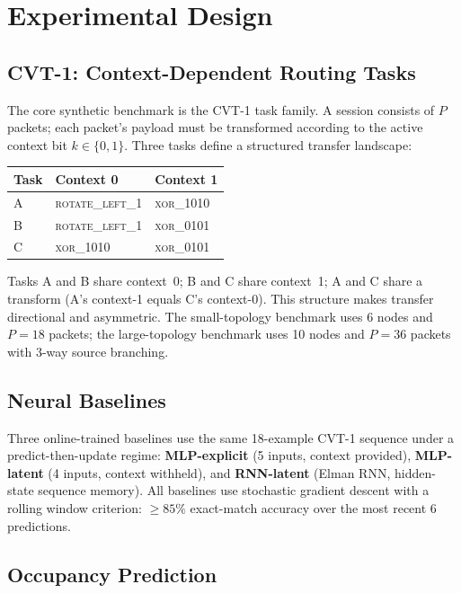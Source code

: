 \documentclass[10pt,twocolumn]{article}
\begin{document}
\section{Experimental Design}
\label{sec:experiments}

\subsection{CVT-1: Context-Dependent Routing Tasks}

The core synthetic benchmark is the CVT-1 task family.
A session consists of $P$ packets; each packet's payload must be transformed
according to the active context bit $k \in \{0, 1\}$.
Three tasks define a structured transfer landscape:

\begin{center}
\small
\begin{tabular}{lll}
\toprule
Task & Context 0 & Context 1 \\
\midrule
A & \textsc{rotate\_left\_1} & \textsc{xor\_1010} \\
B & \textsc{rotate\_left\_1} & \textsc{xor\_0101} \\
C & \textsc{xor\_1010}       & \textsc{xor\_0101} \\
\bottomrule
\end{tabular}
\end{center}

Tasks A and B share context~0; B and C share context~1; A and C share a
transform (A's context-1 equals C's context-0).
This structure makes transfer directional and asymmetric.
The small-topology benchmark uses 6 nodes and $P=18$ packets;
the large-topology benchmark uses 10 nodes and $P=36$ packets
with 3-way source branching.

\subsection{Neural Baselines}

Three online-trained baselines use the same 18-example CVT-1 sequence
under a predict-then-update regime:
\textbf{MLP-explicit} (5 inputs, context provided),
\textbf{MLP-latent} (4 inputs, context withheld), and
\textbf{RNN-latent} (Elman RNN, hidden-state sequence memory).
All baselines use stochastic gradient descent with a rolling window
criterion: $\geq\!85\%$ exact-match accuracy over the most recent 6 predictions.

\subsection{Occupancy Prediction}
\label{sec:occ_design}
\end{document}
